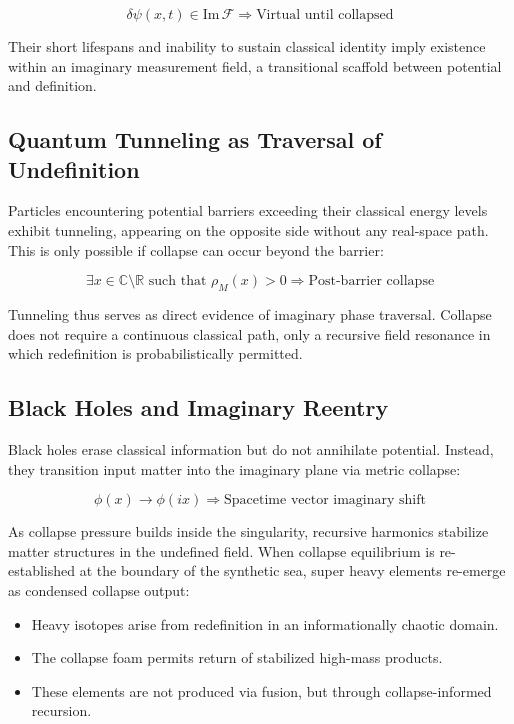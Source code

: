 \[ \delta \psi(x, t) \in \text{Im} \, \mathcal{F} \Rightarrow \text{Virtual until collapsed} \]

Their short lifespans and inability to sustain classical identity imply existence within an imaginary measurement field, a transitional scaffold between potential and definition.

\subsection{Quantum Tunneling as Traversal of Undefinition}
Particles encountering potential barriers exceeding their classical energy levels exhibit tunneling, appearing on the opposite side without any real-space path. This is only possible if collapse can occur beyond the barrier:

\[ \exists x \in \mathbb{C} \setminus \mathbb{R} \text{ such that } \rho_M(x) > 0 \Rightarrow \text{Post-barrier collapse} \]

Tunneling thus serves as direct evidence of imaginary phase traversal. Collapse does not require a continuous classical path, only a recursive field resonance in which redefinition is probabilistically permitted.

\subsection{Black Holes and Imaginary Reentry}
Black holes erase classical information but do not annihilate potential. Instead, they transition input matter into the imaginary plane via metric collapse:

\[ \phi(x) \rightarrow \phi(i x) \Rightarrow \text{Spacetime vector imaginary shift} \]

As collapse pressure builds inside the singularity, recursive harmonics stabilize matter structures in the undefined field. When collapse equilibrium is re-established at the boundary of the synthetic sea, super heavy elements re-emerge as condensed collapse output:

\begin{itemize}
  \item Heavy isotopes arise from redefinition in an informationally chaotic domain.
  \item The collapse foam permits return of stabilized high-mass products.
  \item These elements are not produced via fusion, but through collapse-informed recursion.
\end{itemize}


